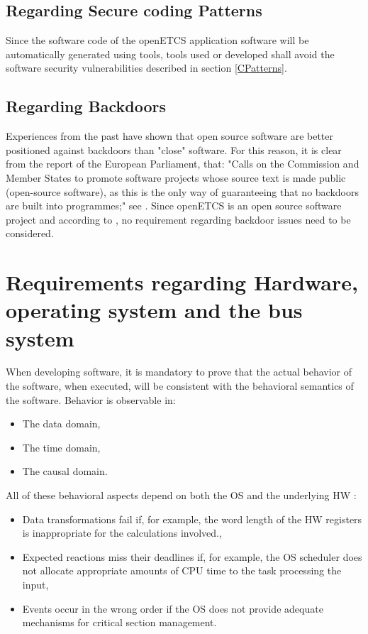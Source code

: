 \documentclass{template/openetcs_report}
\begin{document}
\subsection{Regarding Secure coding Patterns}
Since the software code of the openETCS application software will be automatically generated using tools,  tools used or developed shall avoid the software security vulnerabilities described in section \ref{CPatterns}.

\subsection{Regarding Backdoors}
Experiences from the past have shown that open source software are better positioned against backdoors than "close" software. For this reason, it is clear from the report of the European Parliament, that: "Calls on the Commission and Member States to promote software projects whose source text is made public (open-source software), as this is the only way of guaranteeing that no backdoors are built into programmes;" see \cite{EUParl}.
Since openETCS is an open source software project and according to \cite{EUParl}, no requirement regarding backdoor issues need to be considered.


\section{Requirements regarding Hardware, operating system and the bus system}
When developing software, it is mandatory to prove that the actual behavior of the software, when executed, will be consistent with the behavioral semantics of the software. 
Behavior is observable in: 
\begin{itemize}\itemsep=0pt
  \item The data domain,
  \item The time domain,
  \item The causal domain.
\end{itemize}

All of these behavioral aspects depend on both the OS and the underlying HW \cite{BraPeFe12}:
\begin{itemize}\itemsep=0pt
  \item Data transformations fail if, for example, the word length of the HW registers is inappropriate for the calculations involved.,
  \item Expected reactions miss their deadlines if, for example, the OS scheduler does not allocate appropriate amounts of CPU time to the task processing the input,
  \item Events occur in the wrong order if the OS does not provide adequate mechanisms for critical section management.
\end{itemize}
\end{document}
